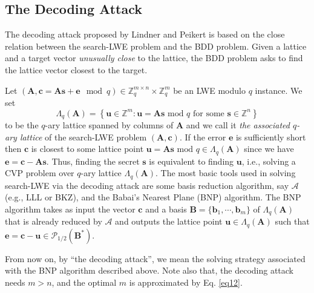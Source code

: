 \documentclass{cta-author}
\begin{document}
\subsection{The Decoding Attack}  \label{heu}

The decoding attack proposed by Lindner and Peikert \cite{LP11} is based on the close relation between the search-LWE problem and the BDD problem. Given a lattice and a target vector \textit{unusually close} to the lattice, the BDD problem asks to find the lattice vector closest to the target. 

Let $(\mathbf{A}, \mathbf{c}=\mathbf{A}\mathbf{s}+\mathbf{e} \mod q) \in \mathbb{Z}_q^{m \times n} \times \mathbb{Z}_q^m$  be an LWE modulo $q$ instance. We set $$\Lambda_q{(\mathbf{A})}=\left\{ \mathbf{u} \in \mathbb{Z}^m: \mathbf{u}=\mathbf{A}\mathbf{s} \text{ mod } q \text{ for some } \mathbf{s} \in \mathbb{Z}^n \right\}$$ to be  the $q$-ary lattice spanned by columns of $\mathbf{A}$ and we call it \textit{the associated $q$-ary lattice} of the search-LWE problem $(\mathbf{A}, \mathbf{c})$. If the error $\mathbf{e}$ is sufficiently short then $\mathbf{c}$ is closest to some lattice point $\mathbf{u}=\mathbf{A}\mathbf{s} \text{ mod } q \in \Lambda_q(\mathbf{A})$ since we have $\mathbf{e}=\mathbf{c}-\mathbf{A}\mathbf{s}.$  Thus, finding the secret $\mathbf{s}$ is equivalent to finding $\mathbf{u}$, i.e., solving a CVP problem over $q$-ary lattice $\Lambda_q{(\mathbf{A})}$. The most basic tools used in solving search-LWE via the decoding attack are some basis reduction algorithm, say $\mathcal{A}$ (e.g., LLL or BKZ), and the Babai's Nearest Plane (BNP) algorithm. The BNP algorithm takes as input the vector  $\mathbf{c}$  and a basis $\mathbf{B}=\{ \mathbf{b}_1,\cdots,\mathbf{b}_{m}\}$ of  $\Lambda_q(\mathbf{A})$ that is already reduced by $\mathcal{A}$ and outputs the lattice point $\mathbf{u} \in \Lambda_q(\mathbf{A})$ such that $\mathbf{e}=\mathbf{c}-\mathbf{u} \in\mathcal{P}_{1/2}(\mathbf{B^*}) $. 

From now on, by ``the decoding attack'', we mean the  solving strategy associated with the BNP algorithm described above. Note also that, the decoding attack needs $m > n$, and the optimal $m$ is approximated by Eq. \eqref{eq12}.
\end{document}

